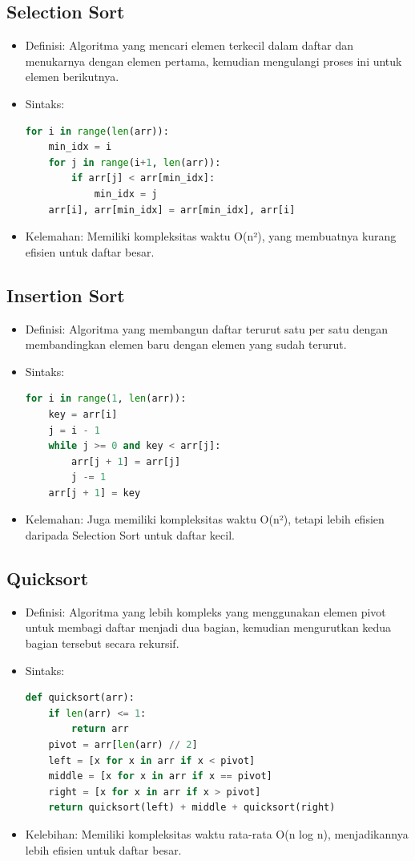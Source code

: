 \documentclass{article}
\begin{document}
\subsection{Selection Sort}
\begin{itemize}
    \item Definisi: Algoritma yang mencari elemen terkecil dalam daftar dan menukarnya dengan elemen pertama, kemudian mengulangi proses ini untuk elemen berikutnya.
    \item Sintaks:
          \begin{lstlisting}[language=Python, caption={}, captionpos=b]
for i in range(len(arr)):
    min_idx = i
    for j in range(i+1, len(arr)):
        if arr[j] < arr[min_idx]:
            min_idx = j
    arr[i], arr[min_idx] = arr[min_idx], arr[i]
\end{lstlisting}
    \item Kelemahan: Memiliki kompleksitas waktu O(n²), yang membuatnya kurang efisien untuk daftar besar.
\end{itemize}

\subsection{Insertion Sort}
\begin{itemize}
    \item Definisi: Algoritma yang membangun daftar terurut satu per satu dengan membandingkan elemen baru dengan elemen yang sudah terurut.
    \item Sintaks:
          \begin{lstlisting}[language=Python, caption={}, captionpos=b]
for i in range(1, len(arr)):
    key = arr[i]
    j = i - 1
    while j >= 0 and key < arr[j]:
        arr[j + 1] = arr[j]
        j -= 1
    arr[j + 1] = key
\end{lstlisting}
    \item Kelemahan: Juga memiliki kompleksitas waktu O(n²), tetapi lebih efisien daripada Selection Sort untuk daftar kecil.
\end{itemize}

\subsection{Quicksort}
\begin{itemize}
    \item Definisi: Algoritma yang lebih kompleks yang menggunakan elemen pivot untuk membagi daftar menjadi dua bagian, kemudian mengurutkan kedua bagian tersebut secara rekursif.
    \item Sintaks:
          \begin{lstlisting}[language=Python, caption={}, captionpos=b]
def quicksort(arr):
    if len(arr) <= 1:
        return arr
    pivot = arr[len(arr) // 2]
    left = [x for x in arr if x < pivot]
    middle = [x for x in arr if x == pivot]
    right = [x for x in arr if x > pivot]
    return quicksort(left) + middle + quicksort(right)
\end{lstlisting}
    \item Kelebihan: Memiliki kompleksitas waktu rata-rata O(n log n), menjadikannya lebih efisien untuk daftar besar.
\end{itemize}
\end{document}
